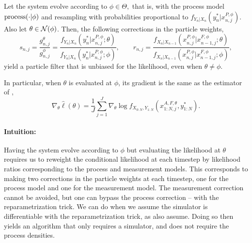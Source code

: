 \documentclass{article}
\begin{document}
\begin{prop}
    \label{prop:dop-correctness}

    Let the system evolve according to $\phi \in \Theta,$ that is, with the process model $\text{process}(\cdot | \phi)$ and resampling with probabilities proportional to $f_{Y_n|X_n}(y_n^* | x_{n,j}^{P,\phi})$. Also let $\theta \in {\mathcal{N}}(\phi)$. Then, the following corrections in the particle weights,
    \begin{equation}
    s_{n,j}=\frac{g_{n,j}^\theta}{g_{n,j}^{\phi}}=\frac{f_{Y_n|X_n}(y_n^*|x_{n,j}^{P, \phi}; \theta)}{f_{Y_n|X_n}(y_n^*|x_{n,j}^{P,\phi}; \phi)}, \qquad r_{n,j}=\frac{f_{X_n|X_{n-1}}(x_{n,j}^{P, \phi}|x_{n-1,j}^{F, \phi}; \theta)}{f_{X_n|X_{n-1}}(x_{n,j}^{P, \phi}|x_{n-1,j}^{F, \phi}; \phi)},
    \end{equation}
    yield a particle filter that is unbiased for the likelihood, even when $\theta \neq \phi$. 
    
    In particular, when $\theta$ is evaluated at $\phi$, its gradient is the same as the estimator of \citet{doucet2011sf},
    \begin{equation}
        \nabla_\theta \hat\ell(\theta) = \frac{1}{J}\sum_{j=1}^J \nabla_\theta \log f_{X_{0:N}, Y_{1:N}}(x_{1:N,j}^{A, F,\theta}, y_{1:N}^*).
    \end{equation}
\end{prop}


\paragraph{Intuition:} Having the system evolve according to $\phi$ but evaluating the likelihood at $\theta$ requires us to reweight the conditional likelihood at each timestep by likelihood ratios corresponding to the process and measurement models. This corresponds to making two corrections in the particle weights at each timestep, one for the process model and one for the measurement model. The measurement correction cannot be avoided, but one can bypass the process correction -- with the reparametrization trick. We can do when we assume the simulator is differentiable with the reparametrization trick, as \cite{corenflos2021ot} also assume. Doing so then yields an algorithm that only requires a simulator, and does not require the process densities. 
\end{document}
